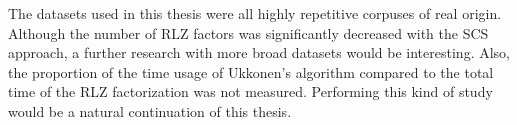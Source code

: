 \documentclass[english,twoside,censored,csm,algorithms-track-2020]{HYthesisML}
\theoremstyle{plain}
\theoremstyle{definition}
\begin{document}
The datasets used in this thesis were all highly repetitive
corpuses of real origin. Although the number of RLZ factors was
significantly decreased with the SCS approach, a further research
with more broad datasets would be interesting. Also, the proportion
of the time usage of Ukkonen's algorithm compared to the total time
of the RLZ factorization was not measured. Performing this kind of
study would be a natural continuation of this thesis.


\cleardoublepage                          %
{}  %
\printbibliography

\backmatter

%

\begin{appendices}

%



\end{appendices}
\end{document}
